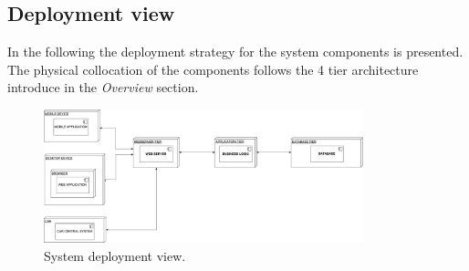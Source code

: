 \subsection{Deployment view}

In the following the deployment strategy for the system components is presented. The physical collocation of the components follows the 4 tier architecture introduce in the \textit{Overview} section.

\begin{figure}[H]
	\includegraphics[width=350px]{../Datas/diagrams/deployment-view.pdf}
	\caption{System deployment view.}
	\label{fig:deployment-view}
\end{figure}
